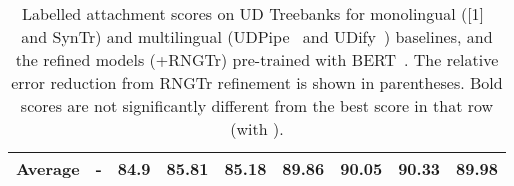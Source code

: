 \begin{table*}[bt]
\begin{adjustbox}{width=\linewidth}
\begin{tabular}{|c|c|c|c|cl|cl|c|}
    \hline
    Average & - & 84.9 & 85.81 & 85.18 & 89.86 & 90.05 & 90.33 & 89.98 \\
    \hline
  \end{tabular}
  \end{adjustbox}
  \caption{\label{ud-las} Labelled attachment scores on UD Treebanks for monolingual ([1]~\cite{Kulmizev_2019} and SynTr) and multilingual (UDPipe~\cite{straka-2018-udpipe} and UDify~\cite{Kondratyuk_2019}) baselines, and the refined models (+RNGTr) pre-trained with BERT~\cite{devlin2018bert}.
    The relative error reduction from RNGTr refinement is shown in parentheses.
    Bold scores are not significantly different from the best score in that row (with ).
}
\end{table*}





